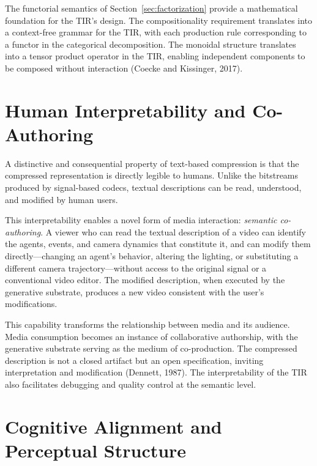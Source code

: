 \documentclass[11pt,a4paper]{article}
\theoremstyle{definition}
\theoremstyle{remark}
\begin{document}
The functorial semantics of Section~\ref{sec:factorization} provide a mathematical foundation for the TIR's design. The compositionality requirement translates into a context-free grammar for the TIR, with each production rule corresponding to a functor in the categorical decomposition. The monoidal structure translates into a tensor product operator in the TIR, enabling independent components to be composed without interaction (Coecke and Kissinger, 2017).

\section{Human Interpretability and Co-Authoring}
\label{sec:human}

A distinctive and consequential property of text-based compression is that the compressed representation is directly legible to humans. Unlike the bitstreams produced by signal-based codecs, textual descriptions can be read, understood, and modified by human users.

This interpretability enables a novel form of media interaction: \emph{semantic co-authoring}. A viewer who can read the textual description of a video can identify the agents, events, and camera dynamics that constitute it, and can modify them directly---changing an agent's behavior, altering the lighting, or substituting a different camera trajectory---without access to the original signal or a conventional video editor. The modified description, when executed by the generative substrate, produces a new video consistent with the user's modifications.

This capability transforms the relationship between media and its audience. Media consumption becomes an instance of collaborative authorship, with the generative substrate serving as the medium of co-production. The compressed description is not a closed artifact but an open specification, inviting interpretation and modification (Dennett, 1987). The interpretability of the TIR also facilitates debugging and quality control at the semantic level.

\section{Cognitive Alignment and Perceptual Structure}
\label{sec:cognitive}
\end{document}
